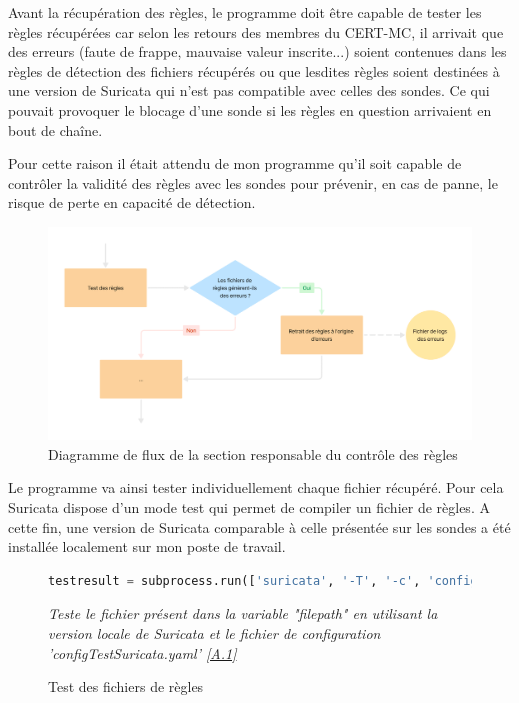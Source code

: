 Avant la récupération des règles, le programme doit être capable de tester les règles récupérées car selon les retours des membres du CERT-MC, il arrivait que des erreurs (faute de frappe, mauvaise valeur inscrite...) soient contenues dans les règles de détection des fichiers récupérés ou que lesdites règles soient destinées à une version de Suricata qui n'est pas compatible avec celles des sondes. Ce qui pouvait provoquer le blocage d'une sonde si les règles en question arrivaient en bout de chaîne.\\

\vspace{0.5em}

Pour cette raison il était attendu de mon programme qu'il soit capable de contrôler la validité des règles avec les sondes pour prévenir, en cas de panne, le risque de perte en capacité de détection.\\

\begin{figure}[h]%
    \center%
    \includegraphics[width=1\textwidth]{assets/diagrameFlux3-2.png}
    \caption[Diagramme de flux de la section responsable du contrôle des règles]{Diagramme de flux de la section responsable du contrôle des règles}\label{fig:diagrameFlux3-2}
\end{figure}

\vspace{1em}

Le programme va ainsi tester individuellement chaque fichier récupéré. Pour cela Suricata dispose d'un mode test qui permet de compiler un fichier de règles. A cette fin, une version de Suricata comparable à celle présentée sur les sondes a été installée localement sur mon poste de travail. 

\newpage

\begin{figure}[h]%
    \center%
\begin{lstlisting}[language=Python]
testresult = subprocess.run(['suricata', '-T', '-c', 'configTestSuricata.yaml','-l', '/tmp/', '-S', filepath], capture_output=True, text=True)
\end{lstlisting}
    {\small
    \textit{Teste le fichier présent dans la variable "filepath" en utilisant la version locale de Suricata et le fichier de configuration 'configTestSuricata.yaml’ \hyperref[chap:annexe1]{[A.1]}}
    }
    \caption[Test des fichiers de règles]{Test des fichiers de règles}\label{fig:TestFileRule}
\end{figure}

